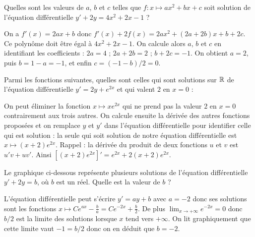 \begin{question}
Quelles sont les valeurs de $a$, $b$ et $c$ telles que $f:x\mapsto ax^2+bx+c$ soit solution de l'équation différentielle $y'+2y=4x^2+2x-1$ ?
\begin{answers}  
\end{answers}
\begin{explanations}
On a \(f'(x)=2ax+b\) donc \(f'(x)+2f(x)=2ax^2+(2a+2b)x+b+2c\). Ce polynôme doit être égal à \(4x^2+2x-1\). On calcule alors \(a\), \(b\) et \(c\) en identifiant les coefficients : $2a=4$ ; $2a+2b=2$ ; $b+2c=-1$. On obtient $a=2$, puis $b=1-a=-1$, et enfin $c=(-1-b)/2=0$.
\end{explanations}
\end{question}


\begin{question}
Parmi les fonctions suivantes, quelles sont celles qui sont solutions sur \(\mathbb{R}\) de l'équation différentielle \(y'=2y+ e^{2x}\) et qui valent \(2\) en \(x=0\) :
\begin{answers}  
\end{answers}
\begin{explanations}
On peut éliminer la fonction \(x\mapsto x e^{2x}\) qui ne prend pas la valeur \(2\) en \(x=0\) contrairement aux trois autres. On calcule ensuite la dérivée des autres fonctions proposées et on remplace \(y\)  et \(y'\) dans l'équation différentielle pour identifier celle qui est solution : la seule qui soit solution de notre équation différentielle est $x \mapsto (x+2)e^{2x}$. Rappel : la dérivée du produit de deux fonctions \(u\) et \(v\) est \(u'v+uv'\). Ainsi $[(x+2)e^{2x}]' =  e^{2x} + 2(x+2)e^{2x}$.
\end{explanations}
\end{question}


\begin{question}
Le graphique ci-dessous représente plusieurs solutions de l'équation différentielle \(y'+2y=b\), où \(b\) est un réel. Quelle est la valeur de \(b\) ?


\begin{answers}
\end{answers}
\begin{explanations} 
L'équation différentielle peut s'écrire \(y'=ay+b\) avec \(a=-2\) donc ses solutions  sont les fonctions \(x\mapsto C e^{ax}-\frac ba=C e^{-2x}+\frac b2\). De plus \(\lim_{x\to +\infty} e^{-2x}=0\) donc \(b/2\) est la limite des solutions lorsque \(x\) tend vers \(+\infty\). On lit graphiquement que cette limite vaut $-1 = b/2$ donc on en déduit que $b=-2$.
\end{explanations}
\end{question}


